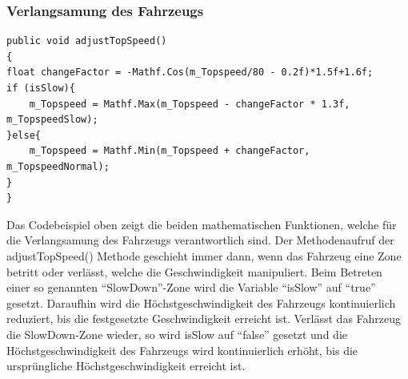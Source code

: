 	\subsubsection{Verlangsamung des Fahrzeugs}
	\begin{lstlisting}
public void adjustTopSpeed()
{
float changeFactor = -Mathf.Cos(m_Topspeed/80 - 0.2f)*1.5f+1.6f;
if (isSlow){
    m_Topspeed = Mathf.Max(m_Topspeed - changeFactor * 1.3f, m_TopspeedSlow);
}else{
    m_Topspeed = Mathf.Min(m_Topspeed + changeFactor, m_TopspeedNormal);
}
}
    \end{lstlisting}
    Das Codebeispiel oben zeigt die beiden mathematischen Funktionen, welche für die Verlangsamung des Fahrzeugs verantwortlich sind. Der Methodenaufruf der adjustTopSpeed() Methode geschieht immer dann, wenn das Fahrzeug eine Zone betritt oder verlässt, welche die Geschwindigkeit manipuliert. Beim Betreten einer so genannten \enquote{SlowDown}-Zone wird die Variable \enquote{isSlow} auf \enquote{true} gesetzt. Daraufhin wird die Höchstgeschwindigkeit des Fahrzeugs kontinuierlich reduziert, bis die festgesetzte Geschwindigkeit erreicht ist. Verlässt das Fahrzeug die SlowDown-Zone wieder, so wird isSlow auf \enquote{false} gesetzt und die Höchstgeschwindigkeit des Fahrzeugs wird kontinuierlich erhöht, bis die ursprüngliche Höchstgeschwindigkeit erreicht ist.

